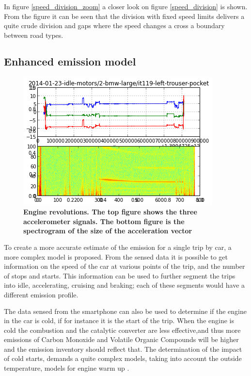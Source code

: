 In figure \ref{speed_division_zoom} a closer look on figure \ref{speed_division} is shown. From the figure it can be seen that the division with fixed speed limits delivers a quite crude division and gaps where the speed changes a cross a boundary between road types. 

\subsection{Enhanced emission model}

\begin{figure}[!ht]
\begin{center}
\includegraphics{idle_BMW.png}
\caption{{\bf Engine revolutions. The top figure shows the three accelerometer signals. The bottom figure is the spectrogram of the size of the acceleration vector}}
\label{idle_bmw}
\end{center}
\end{figure}

To create a more accurate estimate of the emission for a single trip by car, a more complex model is proposed. From the sensed data it is possible to get information on the speed of the car at various points of the trip, and the number of stops and starts. This information can be used to further segment the trips into idle, accelerating, cruising and braking; each of these segments would have a different emission profile. 

The data sensed from the smartphone can also be used to determine if the engine in the car is cold, if for instance it is the start of the trip. When the engine is cold the combustion and the catalytic converter are less effective,and thus more emissions of Carbon Monoxide and Volatile Organic Compounds will be higher and the emission inventory should reflect that. The determination of the impact of cold starts, demands a quite complex models, taking into account the outside temperature, models for engine warm up \cite{Ntziachristos2012}. 


